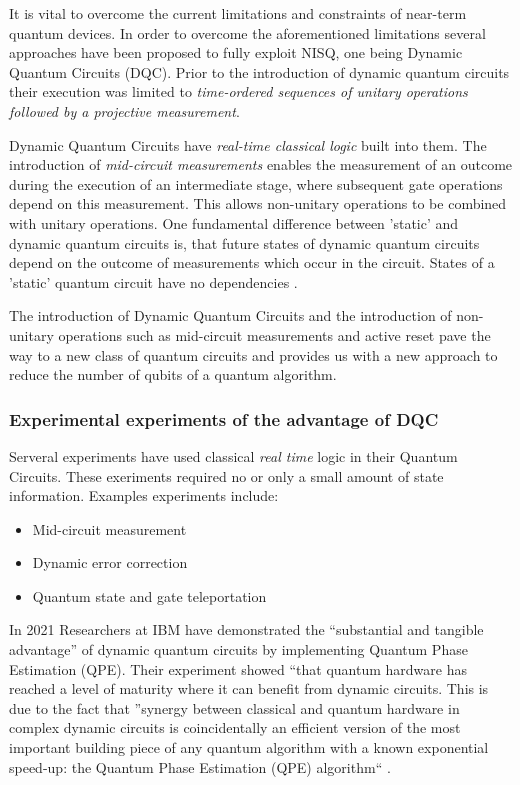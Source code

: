 \documentclass[11pt]{article}
\theoremstyle{definition}
\theoremstyle{definition}
\begin{document}
It is vital to overcome the current limitations and constraints of near-term
quantum devices.
In order to overcome the aforementioned limitations several approaches have
been proposed to fully exploit NISQ, one being Dynamic Quantum Circuits
(DQC).
Prior to the introduction of dynamic quantum circuits their execution
was limited to \emph{time-ordered sequences of unitary operations followed
by a projective measurement}.

Dynamic Quantum Circuits have \emph{real-time classical logic} built into them.
The introduction of \emph{mid-circuit measurements} enables the measurement of
an outcome during the execution of an intermediate stage, where subsequent
gate operations depend on this measurement.
This allows non-unitary operations to be combined with unitary operations.
One fundamental difference between 'static' and dynamic quantum circuits
is, that future states of dynamic quantum circuits depend on the outcome of
measurements which occur in the circuit. States of a 'static' quantum circuit have
no dependencies \cite{corcoles_exploiting_2021}.

The introduction of Dynamic Quantum Circuits and the introduction of non-unitary
operations such as mid-circuit measurements and active reset pave the way
to a new class of quantum circuits and provides us with a new approach to
reduce the number of qubits of a quantum algorithm.


\subsubsection{Experimental experiments of the advantage of DQC}
\label{sec:org2b258cc}
Serveral experiments have used classical \emph{real time} logic in their Quantum
Circuits. These exeriments required no or only a small amount of state
information. Examples experiments include:
\begin{itemize}
\item Mid-circuit measurement \cite{griffiths_semiclassical_1996} \cite{minev_catch_2019}
\item Dynamic error correction \cite{reinhold_error-corrected_2020}
\item Quantum state and gate teleportation \cite{barrett_deterministic_2004}\cite{riebe_deterministic_2004}
\end{itemize}

In 2021 Researchers at IBM have demonstrated the ``substantial and tangible
advantage'' of dynamic quantum circuits by implementing Quantum Phase
Estimation (QPE).
Their experiment showed ``that quantum hardware has reached a level of
maturity where it can benefit from dynamic circuits.
This is due to the fact that ''synergy between classical and quantum
hardware in complex dynamic circuits is coincidentally an efficient version
of the most important building piece of any quantum algorithm with a
known exponential speed-up: the Quantum Phase Estimation (QPE) algorithm``
\cite{corcoles_exploiting_2021} \cite{nielsen_quantum_2010} \cite{cleve_quantum_1998}.
\end{document}
